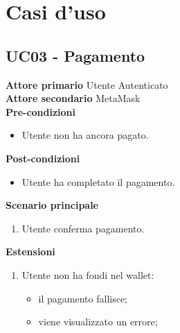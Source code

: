 \section{Casi d'uso}

\subsection{UC03 - Pagamento}
\textbf{Attore primario} Utente Autenticato \\
\textbf{Attore secondario} MetaMask \\
\textbf{Pre-condizioni}
\begin{itemize}
    \item Utente non ha ancora pagato.
\end{itemize}
\textbf{Post-condizioni}
\begin{itemize}
    \item Utente ha completato il pagamento.
\end{itemize}
\textbf{Scenario principale}
\begin{enumerate}
    \item Utente conferma pagamento.
\end{enumerate}
\textbf{Estensioni}
\begin{enumerate}
    \item Utente non ha fondi nel wallet:
    \begin{itemize}
        \item il pagamento fallisce;
        \item viene visualizzato un errore;
    \end{itemize}
\end{enumerate}
